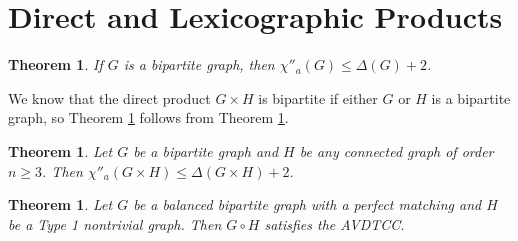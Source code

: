 \documentclass[12pt]{article}
\theoremstyle{definition}
\newtheorem{thm}[defn]{Theorem}
\begin{document}
\section{Direct and Lexicographic Products}

\begin{thm}\cite[Lemma 1.5]{TW2015}\label{Theorem 4.1}
{\em If $G$ is a bipartite graph, then $\chi''_{a}(G)\leq \Delta(G)+2$.}  
\end{thm}

We know that the direct product $G\times H$ is bipartite if either $G$ or $H$ is a bipartite graph, so Theorem \ref{Theorem 4.2} follows from Theorem \ref{Theorem 4.1}.

\begin{thm}\label{Theorem 4.2}
    {\em Let $G$ be a bipartite graph and $H$ be any connected graph of order $n\geq 3$. Then $\chi''_{a}(G\times H)\leq \Delta(G\times H)+2$.}
\end{thm}


\begin{thm}\label{Theorem 4.3}
    {\em Let $G$ be a balanced bipartite graph with a perfect matching and $H$ be a Type 1 nontrivial graph. Then $G\circ H$ satisfies the AVDTCC.}
\end{thm}
\end{document}
